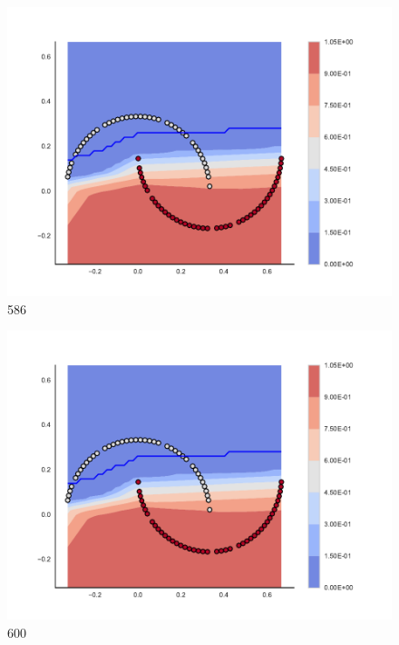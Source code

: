 \begin{subfigure}[b]{0.09\textwidth}
    \includegraphics[clip, trim=2.35cm 1.75cm 4.5cm 0cm,width=\textwidth]{img/convergence/586.pdf}
    \caption{586}
    \label{fig:convergence_586}
\end{subfigure}
%
\begin{subfigure}[b]{0.09\textwidth}
    \includegraphics[clip, trim=2.35cm 1.75cm 4.5cm 0cm,width=\textwidth]{img/convergence/600.pdf}
    \caption{600}
    \label{fig:convergence_600}
\end{subfigure}
%
